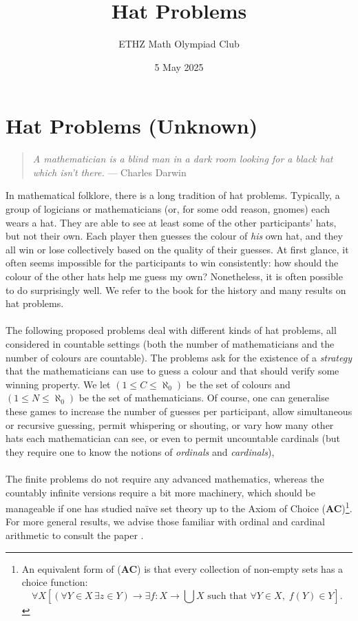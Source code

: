 \documentclass[11pt, a4paper, oneside]{article}
\title{Hat Problems}
\author{ETHZ Math Olympiad Club}
\date{5 May 2025}
\newcommand{\problem}[1][]{\section{#1} \hfill \par}
\theoremstyle{remark}
\begin{document}
\maketitle
\problem[Hat Problems (Unknown)]
\begin{quote}
\textit{A mathematician is a blind man in a dark room looking for a black hat which isn’t there.}
\hfill — Charles Darwin
\end{quote}
In mathematical folklore, there is a long tradition of hat problems. Typically, a group of logicians or mathematicians (or, for some odd reason, gnomes) each wears a hat. They are able to see at least some of the other participants' hats, but not their own. Each player then guesses the colour of \textit{his} own hat, and they all win or lose collectively based on the quality of their guesses. At first glance, it often seems impossible for the participants to win consistently: how should the colour of the other hats help me guess my own? Nonetheless, it is often possible to do surprisingly well. We refer to the book \cite{hardin2013mathematics} for the history and many results on hat problems.
\\\\
The following proposed problems deal with different kinds of hat problems, all considered in countable settings (both the number of mathematicians and the number of colours are countable). The problems ask for the existence of a \textit{strategy} that the mathematicians can use to guess a colour and that should verify some winning property. We let \( \left(1 \leq C \leq \aleph_0\right) \) be the set of colours and \( \left(1 \leq N \leq \aleph_0\right) \) be the set of mathematicians. Of course, one can generalise these games to increase the number of guesses per participant, allow simultaneous or recursive guessing, permit whispering or shouting, or vary how many other hats each mathematician can see, or even to permit uncountable cardinals (but they require one to know the notions of \textit{ordinals} and \textit{cardinals}),
\\\\
The finite problems do not require any advanced mathematics, whereas the countably infinite versions require a bit more machinery, which should be manageable if one has studied naïve set theory up to the Axiom of Choice (\textbf{AC})\footnote{An equivalent form of (\textbf{AC}) is that every collection of non-empty sets has a choice function:
\[
\forall X \left[\left(\forall Y \in X\, \exists z \in Y\right) \to \exists f: X \to \bigcup X \text{ such that } \forall Y \in X,\; f\left(Y\right) \in Y\right].
\]}. For more general results, we advise those familiar with ordinal and cardinal arithmetic to consult the paper \cite{lietz2024infinite}.
\end{document}

